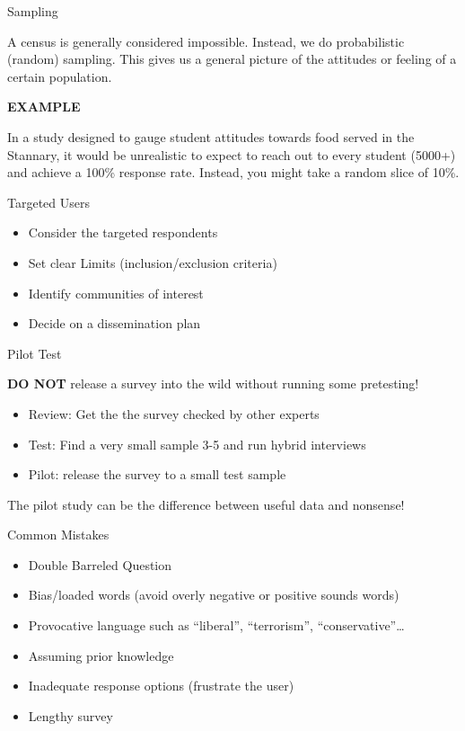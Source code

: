 \documentclass[ignorenonframetext,]{beamer}
\providecommand{\tightlist}{%
  \setlength{\itemsep}{0pt}\setlength{\parskip}{0pt}}
\begin{document}
\begin{frame}
\begin{block}{}
\end{block}

\begin{block}{Sampling}

A census is generally considered impossible. Instead, we do
probabilistic (random) sampling. This gives us a general picture of the
attitudes or feeling of a certain population.

\textbf{EXAMPLE}

In a study designed to gauge student attitudes towards food served in
the Stannary, it would be unrealistic to expect to reach out to every
student (5000+) and achieve a 100\% response rate. Instead, you might
take a random slice of 10\%.

\end{block}

\begin{block}{Targeted Users}

\begin{itemize}
\tightlist
\item
  Consider the targeted respondents
\item
  Set clear Limits (inclusion/exclusion criteria)
\item
  Identify communities of interest
\item
  Decide on a dissemination plan
\end{itemize}

\end{block}

\begin{block}{Pilot Test}

\textbf{DO NOT} release a survey into the wild without running some
pretesting!

\begin{itemize}
\tightlist
\item
  Review: Get the the survey checked by other experts
\item
  Test: Find a very small sample 3-5 and run hybrid interviews
\item
  Pilot: release the survey to a small test sample
\end{itemize}

The pilot study can be the difference between useful data and nonsense!

\end{block}

\begin{block}{ Common Mistakes}

\begin{itemize}
\tightlist
\item
  Double Barreled Question
\item
  Bias/loaded words (avoid overly negative or positive sounds words)
\item
  Provocative language such as ``liberal'', ``terrorism'',
  ``conservative''\ldots{}
\item
  Assuming prior knowledge
\item
  Inadequate response options (frustrate the user)
\item
  Lengthy survey
\end{itemize}


\end{block}
\end{frame}
\end{document}
